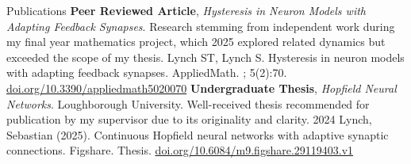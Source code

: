 \begin{rubric}{Publications}
\entry*[]
\textbf{Peer Reviewed Article}, \emph{Hysteresis in Neuron Models with Adapting Feedback Synapses}. \newline
Research stemming from independent work during my final year mathematics project, which \hfill 2025 \newline explored related dynamics but exceeded the scope of my thesis. \vspace{0.2cm} \newline
Lynch ST, Lynch S. Hysteresis in neuron models with adapting feedback synapses. AppliedMath. ; 5(2):70. \href{https://doi.org/10.3390/appliedmath5020070}{doi.org/10.3390/appliedmath5020070}
\entry*[]
\textbf{Undergraduate Thesis}, \emph{Hopfield Neural Networks}.
Loughborough University. \newline
Well-received thesis recommended for publication by my supervisor due to its originality and clarity. \hfill 2024 \vspace{0.2cm} \newline
Lynch, Sebastian (2025). Continuous Hopfield neural networks with adaptive synaptic connections. \newline Figshare. Thesis. \href{https://doi.org/10.6084/m9.figshare.29119403.v1}{doi.org/10.6084/m9.figshare.29119403.v1}
\end{rubric}




